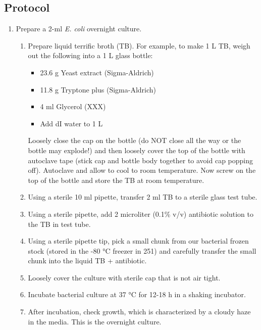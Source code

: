 \subsection{Protocol}
\label{sec:protocol}
\begin{enumerate}

  \item Prepare a 2-ml \textit{E. coli} overnight culture.

  \begin{enumerate}
    \item Prepare liquid terrific broth (TB). For example, to make 1 L TB, weigh out the following into a 1 L glass bottle:
    \begin{itemize}
      \item 23.6 g Yeast extract (Sigma-Aldrich)
      \item 11.8 g Tryptone plus (Sigma-Aldrich)
      \item 4 ml Glycerol (XXX)
      \item Add dI water to 1 L
    \end{itemize}
    Loosely close the cap on the bottle (do NOT close all the way or the bottle may explode!) and then loosely cover the top of the bottle with autoclave tape (stick cap and bottle body together to avoid cap popping off). Autoclave and allow to cool to room temperature. Now screw on the top of the bottle and store the TB at room temperature.
    \item Using a sterile 10 ml pipette, transfer 2 ml TB to a sterile glass test tube.
    \item Using a sterile pipette, add 2 microliter (0.1\% v/v) antibiotic solution to the TB in test tube.
    \item Using a sterile pipette tip, pick a small chunk from our bacterial frozen stock (stored in the -80 °C freezer in 251) and carefully transfer the small chunk into the liquid TB + antibiotic.
    \item Loosely cover the culture with sterile cap that is not air tight.
    \item Incubate bacterial culture at 37 °C for 12-18 h in a shaking incubator.
    \item After incubation, check growth, which is characterized by a cloudy haze in the media. This is the overnight culture.
  \end{enumerate}


\end{enumerate}
